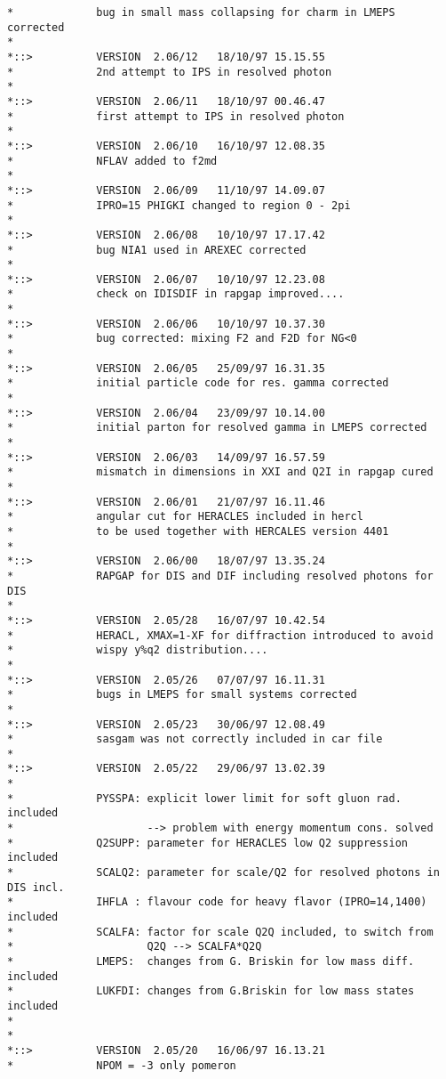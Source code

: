 \documentclass[10pt]{article} \usepackage{dina4}
\begin{document}
\begin{verbatim}
*             bug in small mass collapsing for charm in LMEPS corrected
*
*::>          VERSION  2.06/12   18/10/97 15.15.55
*             2nd attempt to IPS in resolved photon
*
*::>          VERSION  2.06/11   18/10/97 00.46.47
*             first attempt to IPS in resolved photon
*
*::>          VERSION  2.06/10   16/10/97 12.08.35
*             NFLAV added to f2md
*
*::>          VERSION  2.06/09   11/10/97 14.09.07
*             IPRO=15 PHIGKI changed to region 0 - 2pi
*
*::>          VERSION  2.06/08   10/10/97 17.17.42
*             bug NIA1 used in AREXEC corrected
*
*::>          VERSION  2.06/07   10/10/97 12.23.08
*             check on IDISDIF in rapgap improved....
*
*::>          VERSION  2.06/06   10/10/97 10.37.30
*             bug corrected: mixing F2 and F2D for NG<0
*
*::>          VERSION  2.06/05   25/09/97 16.31.35
*             initial particle code for res. gamma corrected
*
*::>          VERSION  2.06/04   23/09/97 10.14.00
*             initial parton for resolved gamma in LMEPS corrected
*
*::>          VERSION  2.06/03   14/09/97 16.57.59
*             mismatch in dimensions in XXI and Q2I in rapgap cured
*
*::>          VERSION  2.06/01   21/07/97 16.11.46
*             angular cut for HERACLES included in hercl
*             to be used together with HERCALES version 4401
*
*::>          VERSION  2.06/00   18/07/97 13.35.24
*             RAPGAP for DIS and DIF including resolved photons for DIS
*
*::>          VERSION  2.05/28   16/07/97 10.42.54
*             HERACL, XMAX=1-XF for diffraction introduced to avoid
*             wispy y%q2 distribution....
*
*::>          VERSION  2.05/26   07/07/97 16.11.31
*             bugs in LMEPS for small systems corrected
*
*::>          VERSION  2.05/23   30/06/97 12.08.49
*             sasgam was not correctly included in car file
*
*::>          VERSION  2.05/22   29/06/97 13.02.39
*
*             PYSSPA: explicit lower limit for soft gluon rad. included
*                     --> problem with energy momentum cons. solved
*             Q2SUPP: parameter for HERACLES low Q2 suppression included
*             SCALQ2: parameter for scale/Q2 for resolved photons in DIS incl.
*             IHFLA : flavour code for heavy flavor (IPRO=14,1400) included
*             SCALFA: factor for scale Q2Q included, to switch from
*                     Q2Q --> SCALFA*Q2Q
*             LMEPS:  changes from G. Briskin for low mass diff. included
*             LUKFDI: changes from G.Briskin for low mass states included
*
*
*::>          VERSION  2.05/20   16/06/97 16.13.21
*             NPOM = -3 only pomeron

\end{verbatim}
\end{document}
